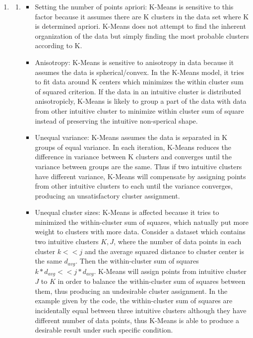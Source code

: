 \documentclass{article}
\begin{document}
\begin{enumerate}
\item
    \begin{enumerate}
    \item
        \begin{itemize}
            \item
                Setting the number of points apriori: K-Means is sensitive to this factor because it assumes there are K clusters in the data set where K is determined apriori. K-Means does not attempt to find the inherent organization of the data but simply finding the most probable clusters according to K.
            \item
                Anisotropy: K-Means is sensitive to anisotropy in data because it assumes the data is spherical/convex. In the K-Means model, it tries to fit data around K centers which minimizes the within cluster sum of squared criterion. If the data in an intuitive cluster is distributed anisotropicly, K-Means is likely to group a part of the data with data from other intuitive cluster to minimize within cluster sum of square instead of preserving the intuitive non-sperical shape.
            \item
                Unequal variance: K-Means assumes the data is separated in K groups of equal variance. In each iteration, K-Means reduces the difference in variance between K clusters and converges until the variance between groups are the same. Thus if two intuitive clusters have different variance, K-Means will compensate by assigning points from other intuitive clusters to each until the variance converges, producing an unsatisfactory cluster assignment.
            \item
                Unequal cluster sizes: K-Means is affected because it tries to minimized the within-cluster sum of squares, which natually put more weight to clusters with more data. Consider a dataset which contains two intuitive clusters $K, J$, where the number of data points in each cluster $k << j$ and the average squared distance to cluster center is the same $d_{avg}$. Then the within-cluster sum of squares $k*d_{avg} << j*d_{avg}$. K-Means will assign points from intuitive cluster $J$ to $K$ in order to balance the within-cluster sum of squares between them, thus producing an undesirable cluster assignment. In the example given by the code, the within-cluster sum of squares are incidentally equal between three intuitive clusters although they have different number of data points, thus K-Means is able to produce a desirable result under such specific condition.

\end{itemize}
\end{enumerate}
\end{enumerate}
\end{document}
